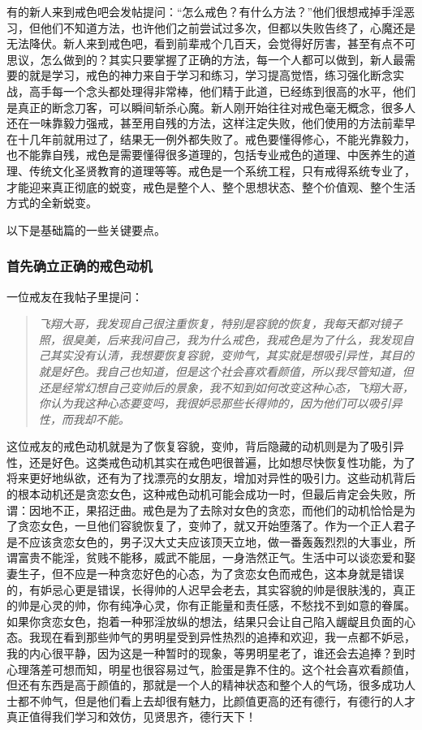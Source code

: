 有的新人来到戒色吧会发帖提问：“怎么戒色？有什么方法？”他们很想戒掉手淫恶习，但他们不知道方法，也许他们之前尝试过多次，但都以失败告终了，心魔还是无法降伏。新人来到戒色吧，看到前辈戒个几百天，会觉得好厉害，甚至有点不可思议，怎么做到的？其实只要掌握了正确的方法，每一个人都可以做到，新人最需要的就是学习，戒色的神力来自于学习和练习，学习提高觉悟，练习强化断念实战，高手每一个念头都处理得非常棒，他们精于此道，已经练到很高的水平，他们是真正的断念刀客，可以瞬间斩杀心魔。新人刚开始往往对戒色毫无概念，很多人还在一味靠毅力强戒，甚至用自残的方法，这样注定失败，他们使用的方法前辈早在十几年前就用过了，结果无一例外都失败了。戒色要懂得修心，不能光靠毅力，也不能靠自残，戒色是需要懂得很多道理的，包括专业戒色的道理、中医养生的道理、传统文化圣贤教育的道理等等。戒色是一个系统工程，只有戒得系统专业了，才能迎来真正彻底的蜕变，戒色是整个人、整个思想状态、整个价值观、整个生活方式的全新蜕变。

以下是基础篇的一些关键要点。

\subsubsection{首先确立正确的戒色动机}

一位戒友在我帖子里提问：

\begin{quote}\it
    飞翔大哥，我发现自己很注重恢复，特别是容貌的恢复，我每天都对镜子照，很臭美，后来我问自己，我为什么戒色，我戒色是为了什么，我发现自己其实没有认清，我想要恢复容貌，变帅气，其实就是想吸引异性，其目的就是好色。我自己也知道，但是这个社会喜欢看颜值，所以我尽管知道，但还是经常幻想自己变帅后的景象，我不知到如何改变这种心态，飞翔大哥，你认为我这种心态要变吗，我很妒忌那些长得帅的，因为他们可以吸引异性，而我却不能。
\end{quote}

这位戒友的戒色动机就是为了恢复容貌，变帅，背后隐藏的动机则是为了吸引异性，还是好色。这类戒色动机其实在戒色吧很普遍，比如想尽快恢复性功能，为了将来更好地纵欲，还有为了找漂亮的女朋友，增加对异性的吸引力。这些动机背后的根本动机还是贪恋女色，这种戒色动机可能会成功一时，但最后肯定会失败，所谓：因地不正，果招迂曲。戒色是为了去除对女色的贪恋，而他们的动机恰恰是为了贪恋女色，一旦他们容貌恢复了，变帅了，就又开始堕落了。作为一个正人君子是不应该贪恋女色的，男子汉大丈夫应该顶天立地，做一番轰轰烈烈的大事业，所谓富贵不能淫，贫贱不能移，威武不能屈，一身浩然正气。生活中可以谈恋爱和娶妻生子，但不应是一种贪恋好色的心态，为了贪恋女色而戒色，这本身就是错误的，有妒忌心更是错误，长得帅的人迟早会老去，其实容貌的帅是很肤浅的，真正的帅是心灵的帅，你有纯净心灵，你有正能量和责任感，不愁找不到如意的眷属。如果你贪恋女色，抱着一种邪淫放纵的想法，结果只会让自己陷入龌龊且负面的心态。我现在看到那些帅气的男明星受到异性热烈的追捧和欢迎，我一点都不妒忌，我的内心很平静，因为这是一种暂时的现象，等男明星老了，谁还会去追捧？到时心理落差可想而知，明星也很容易过气，脸蛋是靠不住的。这个社会喜欢看颜值，但还有东西是高于颜值的，那就是一个人的精神状态和整个人的气场，很多成功人士都不帅气，但是他们看上去却很有魅力，比颜值更高的还有德行，有德行的人才真正值得我们学习和效仿，见贤思齐，德行天下！

